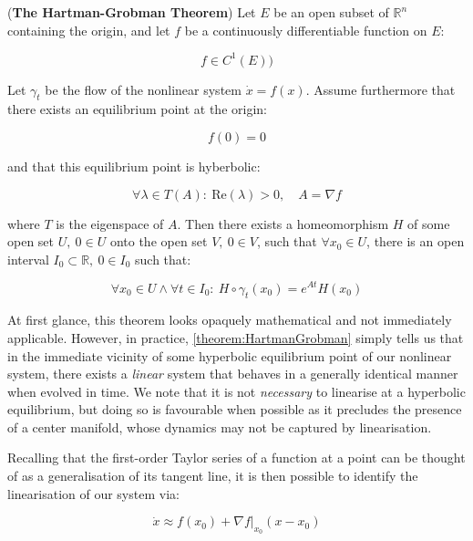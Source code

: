 \begin{theorem}\label{theorem:HartmanGrobman}
(\textbf{The Hartman-Grobman Theorem}) Let $E$ be an open subset of $\mathbb{R}^n$ containing the origin, and let $f$ be a continuously differentiable function on $E$:
 
\begin{equation*}
f \in C^1(E))
\end{equation*}

Let $\gamma_t$ be the flow of the nonlinear system $\dot{x} = f(x)$. Assume furthermore that there exists an equilibrium point at the origin: 

\begin{equation*}
f(0) = 0
\end{equation*}

and that this equilibrium point is hyberbolic: 

\begin{equation*}
\forall \lambda \in T(A): \ \text{Re}(\lambda) > 0, \quad A = \nabla f  
\end{equation*}

where $T$ is the eigenspace of $A$. Then there exists a homeomorphism $H$ of some open set $U, \ 0 \in U$ onto the open set $V, \ 0 \in V$, such that $\forall x_0 \in U$, there is an open interval $I_0 \subset \mathbb{R}, \ 0 \in I_0$ such that:

\begin{equation*}
	\forall x_0 \in U \wedge \forall t \in I_0: \ H \circ \gamma_t(x_0) = e^{At}H(x_0)
\end{equation*}
\end{theorem}

At first glance, this theorem looks opaquely mathematical and not immediately applicable. However, in practice, \cref{theorem:HartmanGrobman} simply tells us that in the immediate vicinity of some hyperbolic equilibrium point of our nonlinear system, there exists a \textit{linear} system that behaves in a generally identical manner when evolved in time. We note that it is not \textit{necessary} to linearise at a hyperbolic equilibrium, but doing so is favourable when possible as it precludes the presence of a center manifold, whose dynamics may not be captured by linearisation.

Recalling that the first-order Taylor series of a function at a point can be thought of as a  generalisation of its tangent line, it is then possible to identify the linearisation of our system via:

\begin{equation}\label{eq:TaylorSeries}
\dot{x} \approx f(x_0) + \nabla f\bigg\rvert_{x_0} (x-x_0)
\end{equation}


